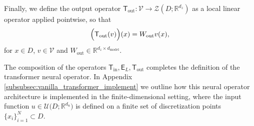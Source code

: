 \documentclass[twoside]{article}
\newcommand{\1}{\mathbbm{1}}
\newcommand{\R}{\mathbbm{R}}
\newcommand{\cU}{\mathcal{U}}
\newcommand{\cZ}{\mathcal{Z}}
\newcommand{\cV}{\mathcal{V}}
\newcommand{\sT}{\mathsf{T}}
\newcommand{\sE}{\mathsf{E}}
\providecommand{\mathbbm}{\mathbb} %
\begin{document}
Finally, we define the output operator $\sT_\textrm{out} : \cV \to \cZ(D; \R^{d_z})$ as a local linear operator applied pointwise, so that 
\begin{equation}
    \Bigl(\sT_\textrm{out}({v})\Bigr)(x) = W_\textrm{out}v(x),
\end{equation}
for $x \in D$, $v \in \cV$ and $W_\textrm{out} \in \R^{d_z\times d_\textrm{model}}$. 

The composition of the operators $\sT_\textrm{in}, \sE_L, \sT_\textrm{out}$ completes the definition of the transformer neural operator. In Appendix \ref{subsubsec:vanilla_transformer_implement} we outline how this neural operator architecture is implemented in the finite-dimensional setting, where the input function $u\in \cU\bigl( D; \R^{d_u} \bigr)$ is defined on a finite set of discretization points $\{x_i\}_{i=1}^N\subset D$.

\end{document}
